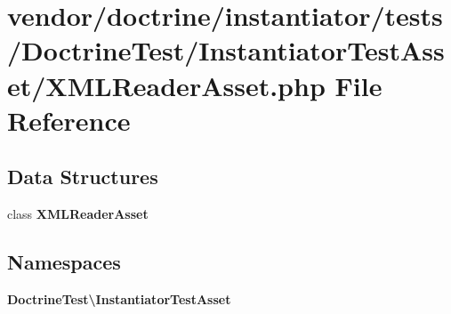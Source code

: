 \section{vendor/doctrine/instantiator/tests/\+Doctrine\+Test/\+Instantiator\+Test\+Asset/\+X\+M\+L\+Reader\+Asset.php File Reference}
\label{_x_m_l_reader_asset_8php}
\subsection*{Data Structures}
\begin{DoxyCompactItemize}
\item 
class {\bf X\+M\+L\+Reader\+Asset}
\end{DoxyCompactItemize}
\subsection*{Namespaces}
\begin{DoxyCompactItemize}
\item 
 {\bf Doctrine\+Test\textbackslash{}\+Instantiator\+Test\+Asset}
\end{DoxyCompactItemize}

